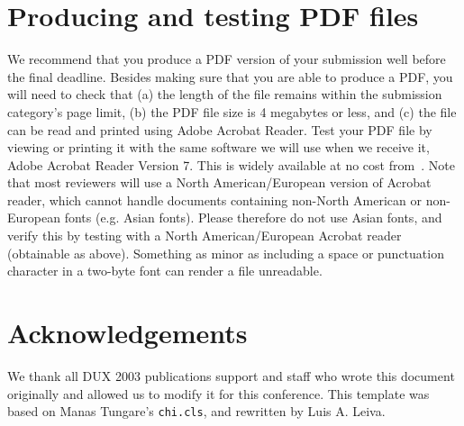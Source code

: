 \documentclass{chi-ext}
\begin{document}
\section{Producing and testing PDF files}
We recommend that you produce a PDF version of your submission well before the final deadline. 
Besides making sure that you are able to produce a PDF, you will need to check that (a) the length of the file remains within the submission category's page limit, (b) the PDF file size is 4 megabytes or less, and (c) the file can be read and printed using Adobe Acrobat Reader. 
Test your PDF file by viewing or printing it with the same software we will use when we receive it, Adobe Acrobat Reader Version 7. 
This is widely available at no cost from~\cite{Acrobat7}.  
Note that most reviewers will use a North American/European version of Acrobat reader, which cannot handle documents containing non-North American or non-European fonts (e.g. Asian fonts).  
Please therefore do not use Asian fonts, and verify this by testing with a North American/European Acrobat reader (obtainable as above). Something as minor as including a space or punctuation character in a two-byte font can render a file unreadable.

\section{Acknowledgements}
We thank all DUX 2003 publications support and staff who wrote this document originally and allowed us to modify it for this conference.
This template was based on Manas Tungare's \texttt{chi.cls}, and rewritten by Luis A. Leiva.

\balance


\end{document}
